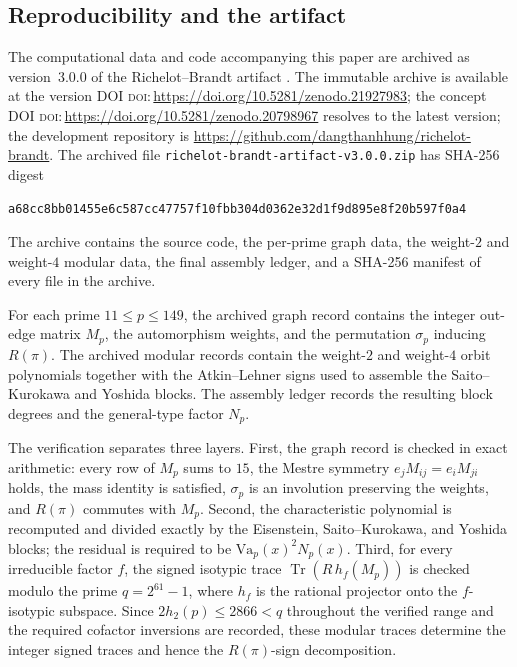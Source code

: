 \documentclass[10pt,a4paper]{amsart}
\providecommand{\doi}[1]{\textsc{doi:}\,\url{https://doi.org/#1}}
\newcommand{\Va}{\mathrm{Va}}
\providecommand{\Va}{\mathrm{Va}}
\begin{document}
	\subsection{Reproducibility and the artifact}
	\label{ss:reproducibility}
	
	The computational data and code accompanying this paper are archived as
	version~3.0.0 of the Richelot--Brandt artifact
	\cite{artifact}. The immutable archive is available at the version DOI
	\doi{10.5281/zenodo.21927983}; the concept DOI
	\doi{10.5281/zenodo.20798967} resolves to the latest version; the development repository is
	\url{https://github.com/dangthanhhung/richelot-brandt}. The archived file
	\texttt{richelot-brandt-artifact-v3.0.0.zip} has SHA-256 digest
	\begin{center}
		\texttt{a68cc8bb01455e6c587cc47757f10fbb\allowbreak 304d0362e32d1f9d895e8f20b597f0a4}
	\end{center}
	The archive
	contains the source code, the per-prime graph data, the weight-$2$ and
	weight-$4$ modular data, the final assembly ledger, and a SHA-256 manifest
	of every file in the archive.
	
	For each prime $11\le p\le149$, the archived graph record contains the
	integer out-edge matrix $M_p$, the automorphism weights, and the
	permutation $\sigma_p$ inducing $R(\pi)$. The archived modular records
	contain the weight-$2$ and weight-$4$ orbit polynomials together with the
	Atkin--Lehner signs used to assemble the Saito--Kurokawa and Yoshida
	blocks. The assembly ledger records the resulting block degrees and the
	general-type factor $N_p$.
	
	The verification separates three layers. First, the graph record is
	checked in exact arithmetic: every row of $M_p$ sums to $15$, the Mestre
	symmetry $e_jM_{ij}=e_iM_{ji}$ holds, the mass identity is satisfied,
	$\sigma_p$ is an involution preserving the weights, and $R(\pi)$ commutes
	with $M_p$. Second, the characteristic polynomial is recomputed and
	divided exactly by the Eisenstein, Saito--Kurokawa, and Yoshida blocks;
	the residual is required to be $\Va_p(x)^2N_p(x)$. Third, for every
	irreducible factor $f$, the signed isotypic trace
	$\operatorname{Tr}(R\,h_f(M_p))$ is checked modulo the prime
	$q=2^{61}-1$, where $h_f$ is the rational projector onto the
	$f$-isotypic subspace. Since $2h_2(p)\le2866<q$ throughout the verified
	range and the required cofactor inversions are recorded, these modular
	traces determine the integer signed traces and hence the
	$R(\pi)$-sign decomposition.
	
\end{document}
